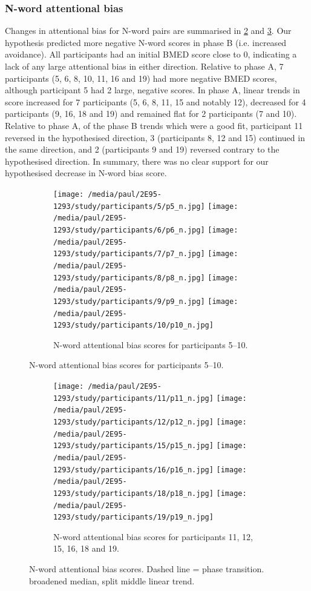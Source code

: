 \documentclass[man,floatsintext,a4paper,biblatex]{apa6}\usepackage[]{graphicx}\usepackage[]{color}
\newcommand\strokeA{\tikz[baseline=-.5ex]{ \draw[black,thick,align=center] (0,0) -- (2ex,0); }}
\newcommand\strokeB{\tikz[baseline=-.5ex]{ \draw[red,thick,dotted] (0,0) -- (2ex,0); }}
\begin{document}
\subsubsection{N-word attentional bias}

Changes in attentional bias for N-word pairs are summarised in
\cref{fig:va-n-a} and \cref{fig:va-n-b}. Our hypothesis predicted
more negative N-word scores in phase B (i.e. increased avoidance).
All participants had an initial BMED score close to 0, indicating a
lack of any large attentional bias in either direction. Relative to
phase A, 7 participants (5, 6, 8, 10, 11, 16 and 19) had more negative
BMED scores, although participant 5 had 2 large, negative scores. In
phase A, linear trends in score increased for 7 participants (5, 6, 8,
11, 15 and notably 12), decreased for 4 participants (9, 16, 18 and 19)
and remained flat for 2 participants (7 and 10). Relative to phase A,
of the phase B trends which were a good fit, participant 11 reversed in
the hypothesised direction, 3 (participants 8, 12 and 15) continued in
the same direction, and 2 (participants 9 and 19) reversed contrary to
the hypothesised direction. In summary, there was no clear support for
our hypothesised decrease in N-word bias score.

\begin{figure}[!htbp]
  \begin{subfigure}[!htbp]{\textwidth}
    \texttt{[image: /media/paul/2E95-1293/study/participants/5/p5\_n.jpg]}
    \texttt{[image: /media/paul/2E95-1293/study/participants/6/p6\_n.jpg]}
    \texttt{[image: /media/paul/2E95-1293/study/participants/7/p7\_n.jpg]}
    \texttt{[image: /media/paul/2E95-1293/study/participants/8/p8\_n.jpg]}
    \texttt{[image: /media/paul/2E95-1293/study/participants/9/p9\_n.jpg]}
    \texttt{[image: /media/paul/2E95-1293/study/participants/10/p10\_n.jpg]}
    \caption{N-word attentional bias scores for participants 5--10.}
    \label{fig:va-n-a}
    \end{subfigure}
\end{figure}

\begin{figure}
\ContinuedFloat
  \begin{subfigure}[!htbp]{\textwidth}
    \texttt{[image: /media/paul/2E95-1293/study/participants/11/p11\_n.jpg]}
    \texttt{[image: /media/paul/2E95-1293/study/participants/12/p12\_n.jpg]}
    \texttt{[image: /media/paul/2E95-1293/study/participants/15/p15\_n.jpg]}
    \texttt{[image: /media/paul/2E95-1293/study/participants/16/p16\_n.jpg]}
    \texttt{[image: /media/paul/2E95-1293/study/participants/18/p18\_n.jpg]}
    \texttt{[image: /media/paul/2E95-1293/study/participants/19/p19\_n.jpg]}
    \caption{N-word attentional bias scores for participants 11, 12, 15, 16, 18 and 19.}
    \label{fig:va-n-b}
  \end{subfigure}
\caption{N-word attentional bias scores. Dashed line = phase transition. \protect\strokeA{} broadened
median, \protect\strokeB{} split middle linear trend.}
\label{fig:va-n}
\end{figure}
\clearpage
\end{document}
